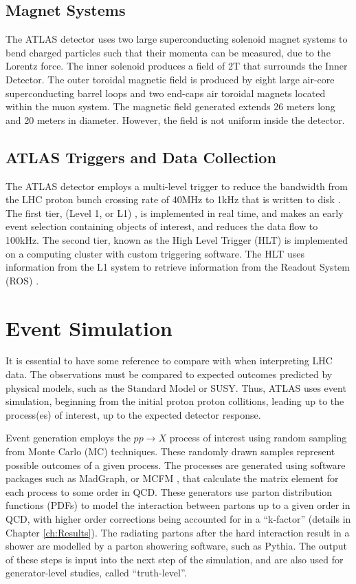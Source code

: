 \documentclass[11pt,a4paper,openright,twoside]{report}
\begin{document}
\subsection{Magnet Systems}
The ATLAS detector uses two large superconducting solenoid magnet systems to bend charged particles such that their momenta can be measured, due to the Lorentz force. The inner solenoid produces a field of 2T that surrounds the Inner Detector. The outer toroidal magnetic field is produced by eight large air-core superconducting barrel loops and two end-caps air toroidal magnets located within the muon system. The magnetic field generated extends 26 meters long and 20 meters in diameter. However, the field is not uniform inside the detector.

\subsection{ATLAS Triggers and Data Collection}
The ATLAS detector employs a multi-level trigger to reduce the bandwidth from the LHC proton bunch crossing rate of 40MHz to 1kHz that is written to disk \cite{trigger1,trigger2}. The first tier, (Level 1, or L1) \cite{L1}, is implemented in real time, and makes an early event selection containing objects of interest, and reduces the data flow to 100kHz. The second tier, known as the High Level Trigger (HLT) \cite{HLT} is implemented on a computing cluster with custom triggering software. The HLT uses information from the L1 system to retrieve information from the Readout System (ROS) \cite{ROS}.

\section{Event Simulation}
It is essential to have some reference to compare with when interpreting LHC data. The observations must be compared to expected outcomes predicted by physical models, such as the Standard Model or SUSY. Thus, ATLAS uses event simulation, beginning from the initial proton proton collitions, leading up to the process(es) of interest, up to the expected detector response.

Event generation employs the $pp\to X$ process of interest using random sampling from Monte Carlo (MC) techniques. These randomly drawn samples represent possible outcomes of a given process. The processes are generated using software packages such as MadGraph\cite{MadGraph}, or MCFM \cite{MCFM}, that calculate the matrix element for each process to some order in QCD. These generators use parton distribution functions (PDFs) to model the interaction between partons up to a given order in QCD, with higher order corrections being accounted for in a ``k-factor'' (details in Chapter \ref{ch:Results}). The radiating partons after the hard interaction result in a shower are modelled by a parton showering software, such as Pythia\cite{pythia}. The output of these steps is input into the next step of the simulation, and are also used for generator-level studies, called ``truth-level''.
\end{document}
